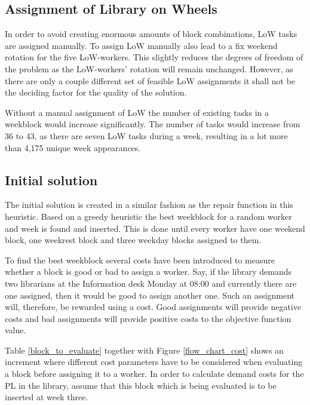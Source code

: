 \subsection{Assignment of Library on Wheels} \label{LoW_assignment}
In order to avoid creating enormous amounts of block combinations, LoW tasks are assigned manually. To assign LoW manually also lead to a fix weekend rotation for the five LoW-workers. This slightly reduces the degrees of freedom of the problem as the LoW-workers' rotation will remain unchanged. However, as there are only a couple different set of feasible LoW assignments it shall not be the deciding factor for the quality of the solution.

Without a manual assignment of LoW the number of existing tasks in a weekblock would increase significantly. The number of tasks would increase from 36 to 43, as there are seven LoW tasks during a week, resulting in a lot more than 4,175 unique week appearances. %

\subsection{Initial solution} \label{initial_solution}
The initial solution is created in a similar fashion as the repair function in this heuristic. Based on a greedy heuristic the best weekblock for a random worker and week is found and inserted. This is done until every worker have one weekend block, one weekrest block and three weekday blocks assigned to them.

To find the best weekblock several costs have been introduced to measure whether a block is good or bad to assign a worker. Say, if the library demands two librarians at the Information desk Monday at 08:00 and currently there are one assigned, then it would be good to assign another one. Such an assignment will, therefore, be rewarded using a cost. Good assignments will provide negative costs and bad assignments will provide positive costs to the objective function value.

Table \ref{block_to_evaluate} together with Figure \ref{flow_chart_cost} shows an increment where different cost parameters have to be considered when evaluating a block before assigning it to a worker. In order to calculate demand costs for the PL in the library, assume that this block which is being evaluated is to be inserted at week three.

